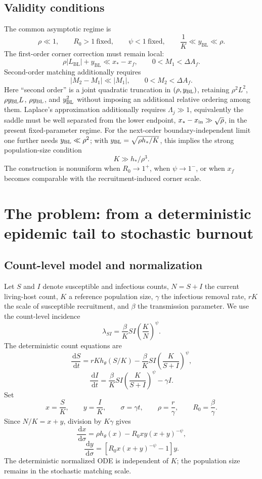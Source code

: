 \documentclass[11pt]{article}
\newcommand{\Rzero}{R_0}
\newcommand{\hth}{h_\theta}
\newcommand{\xf}{x_f}
\newcommand{\xs}{x_*}
\newcommand{\yin}{y_{\mathrm{BL}}}
\newcommand{\dd}{\,\mathrm{d}}
\begin{document}
\subsection{Validity conditions}
The common asymptotic regime is
\[
\rho\ll1,\qquad \Rzero>1\ \mathrm{fixed},\qquad \psi<1\ \mathrm{fixed},\qquad
\frac1K\ll\yin\ll\rho.
\]
The first-order corner correction must remain local:
\[
\rho|L_{\mathrm{BL}}|+\yin\ll\xs-\xf,
\qquad 0<M_1<\Delta A_f.
\]
Second-order matching additionally requires
\[
|M_2-M_1|\ll|M_1|,
\qquad 0<M_2<\Delta A_f.
\]
Here ``second order'' is a joint quadratic truncation in \((\rho,y_{\rm BL})\), retaining \(\rho^2L^2\), \(\rho y_{\rm BL}L\), \(\rho y_{\rm BL}\), and \(y_{\rm BL}^2\) without imposing an additional relative ordering among them.
Laplace's approximation additionally requires \(\Lambda_j\gg1\), equivalently the saddle must be well separated from the lower endpoint, \(x_*-x_{\rm in}\gg\sqrt\rho\), in the present fixed-parameter regime. For the next-order boundary-independent limit one further needs \(y_{\rm BL}\ll\rho^2\); with \(y_{\rm BL}=\sqrt{\rho h_*/K}\), this implies the strong population-size condition\[\boxed{K\gg h_*/\rho^3}.\]
The construction is nonuniform when \(\Rzero\to1^+\), when \(\psi\to1^-\), or when \(\xf\) becomes comparable with the recruitment-induced corner scale.

\section{The problem: from a deterministic epidemic tail to stochastic burnout}

\subsection{Count-level model and normalization}
Let \(S\) and \(I\) denote susceptible and infectious counts, \(N=S+I\) the current living-host count, \(K\) a reference population size, \(\gamma\) the infectious removal rate, \(rK\) the scale of susceptible recruitment, and \(\beta\) the transmission parameter. We use the count-level incidence
\[
\lambda_{SI}=\frac{\beta}{K}SI\left(\frac{K}{N}\right)^\psi.
\]
The deterministic count equations are
\[
\frac{\dd S}{\dd t}
=rK\hth(S/K)-\frac{\beta}{K}SI\left(\frac{K}{S+I}\right)^\psi,
\]
\[
\frac{\dd I}{\dd t}
=\frac{\beta}{K}SI\left(\frac{K}{S+I}\right)^\psi-\gamma I.
\]
Set
\[
x=\frac{S}{K},\qquad y=\frac{I}{K},\qquad \sigma=\gamma t,
\qquad \rho=\frac r\gamma,\qquad \Rzero=\frac\beta\gamma.
\]
Since \(N/K=x+y\), division by \(K\gamma\) gives
\[
\frac{\dd x}{\dd\sigma}
=\rho\hth(x)-\Rzero xy(x+y)^{-\psi},
\]
\[
\frac{\dd y}{\dd\sigma}
=\left[\Rzero x(x+y)^{-\psi}-1\right]y.
\]
The deterministic normalized ODE is independent of \(K\); the population size remains in the stochastic matching scale.
\end{document}
